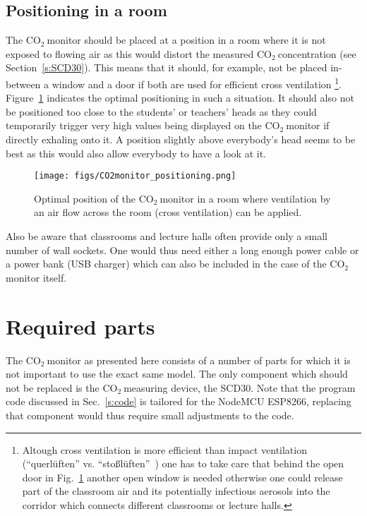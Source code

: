 \documentclass[12pt,a4paper]{article}
\newcommand{\coo}{\ensuremath{\mathrm{CO_2}~}}
\begin{document}
\subsection{Positioning in a room}
The \coo monitor should be placed at a position in a room where it is not exposed to flowing air as this would distort the measured \coo concentration (see Section~\ref{s:SCD30}). This means that it should, for example, not be placed in-between a window and a door if both are used for efficient cross ventilation%
\footnote{Altough cross ventilation is more efficient than impact ventilation (``querlüften'' vs. ``stoßlüften''~\cite{GUARDIAN2020}) one has to take care that behind the open door in Fig.~\ref{f:CO2_monitor_positioning} another open window is needed otherwise one could release part of the classroom air and its potentially infectious aerosols into the corridor which connects different classrooms or lecture halls.}. 
Figure~\ref{f:CO2_monitor_positioning} indicates the optimal positioning in such a situation. It should also not be positioned too close to the students' or teachers' heads as they could temporarily trigger very high values being displayed on the \coo monitor if directly exhaling onto it. A position slightly above everybody's head seems to be best as this would also allow everybody to have a look at it. 
\begin{figure}[tb]
\centering
\texttt{[image: figs/CO2monitor\_positioning.png]}
\caption{Optimal position of the \coo monitor in a room where ventilation by an air flow across the room (cross ventilation) can be applied.}
\label{f:CO2_monitor_positioning}
\end{figure}

Also be aware that classrooms and lecture halls often provide only a small number of wall sockets. One would thus need either a long enough power cable or a power bank (USB charger) which can also be included in the case of the \coo monitor itself.


\section{Required parts}
The \coo monitor as presented here consists of a number of parts for which it is not important to use the exact same model. The only component which should not be replaced is the \coo measuring device, the SCD30. Note that the program code discussed in Sec.~\ref{s:code} is tailored for the NodeMCU ESP8266, replacing that component would thus require small adjustments to the code. 
\end{document}
